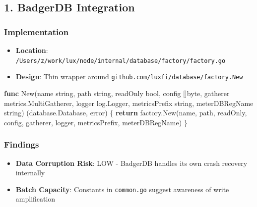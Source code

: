 \documentclass[
]{article}
\newenvironment{Shaded}{}{}
\newcommand{\ControlFlowTok}[1]{\textcolor[rgb]{0.00,0.44,0.13}{\textbf{#1}}}
\newcommand{\DataTypeTok}[1]{\textcolor[rgb]{0.56,0.13,0.00}{#1}}
\newcommand{\KeywordTok}[1]{\textcolor[rgb]{0.00,0.44,0.13}{\textbf{#1}}}
\newcommand{\NormalTok}[1]{#1}
\newcommand{\OperatorTok}[1]{\textcolor[rgb]{0.40,0.40,0.40}{#1}}
\providecommand{\tightlist}{%
  \setlength{\itemsep}{0pt}\setlength{\parskip}{0pt}}
\begin{document}
\subsection{1. BadgerDB Integration}\label{1-badgerdb-integration}

\subsubsection{Implementation}\label{implementation}

\begin{itemize}
\tightlist
\item
  \textbf{Location}:
  \texttt{/Users/z/work/lux/node/internal/database/factory/factory.go}
\item
  \textbf{Design}: Thin wrapper around
  \texttt{github.com/luxfi/database/factory.New}
\end{itemize}

\begin{Shaded}
\begin{Highlighting}[]
\KeywordTok{func}\NormalTok{ New}\OperatorTok{(}\NormalTok{name }\DataTypeTok{string}\OperatorTok{,}\NormalTok{ path }\DataTypeTok{string}\OperatorTok{,}\NormalTok{ readOnly }\DataTypeTok{bool}\OperatorTok{,}\NormalTok{ config }\OperatorTok{[]}\DataTypeTok{byte}\OperatorTok{,}
\NormalTok{    gatherer metrics}\OperatorTok{.}\NormalTok{MultiGatherer}\OperatorTok{,}\NormalTok{ logger log}\OperatorTok{.}\NormalTok{Logger}\OperatorTok{,}
\NormalTok{    metricsPrefix }\DataTypeTok{string}\OperatorTok{,}\NormalTok{ meterDBRegName }\DataTypeTok{string}\OperatorTok{)} \OperatorTok{(}\NormalTok{database}\OperatorTok{.}\NormalTok{Database}\OperatorTok{,} \DataTypeTok{error}\OperatorTok{)} \OperatorTok{\{}
    \ControlFlowTok{return}\NormalTok{ factory}\OperatorTok{.}\NormalTok{New}\OperatorTok{(}\NormalTok{name}\OperatorTok{,}\NormalTok{ path}\OperatorTok{,}\NormalTok{ readOnly}\OperatorTok{,}\NormalTok{ config}\OperatorTok{,}\NormalTok{ gatherer}\OperatorTok{,}\NormalTok{ logger}\OperatorTok{,}\NormalTok{ metricsPrefix}\OperatorTok{,}\NormalTok{ meterDBRegName}\OperatorTok{)}
\OperatorTok{\}}
\end{Highlighting}
\end{Shaded}

\subsubsection{Findings}\label{findings}

\begin{itemize}
\tightlist
\item
  \textbf{Data Corruption Risk}: LOW - BadgerDB handles its own crash
  recovery internally
\item
  \textbf{Batch Capacity}: Constants in \texttt{common.go} suggest
  awareness of write amplification
\end{itemize}
\end{document}
